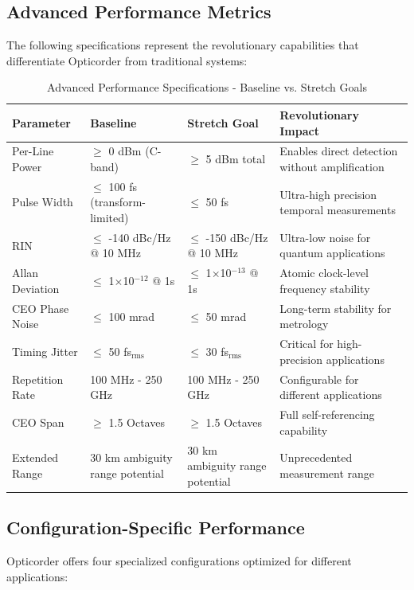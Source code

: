 \documentclass[11pt,a4paper]{article}
\begin{document}
\subsection{Advanced Performance Metrics}
The following specifications represent the revolutionary capabilities that differentiate Opticorder from traditional systems:

\begin{table}[ht]
\centering
\caption{Advanced Performance Specifications - Baseline vs. Stretch Goals}
\begin{tabular}{@{}llll@{}}
\toprule
\textbf{Parameter} & \textbf{Baseline} & \textbf{Stretch Goal} & \textbf{Revolutionary Impact} \\
\midrule
Per-Line Power & $\geq$ 0 dBm (C-band) & $\geq$ 5 dBm total & Enables direct detection without amplification \\
Pulse Width & $\leq$ 100 fs (transform-limited) & $\leq$ 50 fs & Ultra-high precision temporal measurements \\
RIN & $\leq$ -140 dBc/Hz @ 10 MHz & $\leq$ -150 dBc/Hz @ 10 MHz & Ultra-low noise for quantum applications \\
Allan Deviation & $\leq$ 1$\times$10$^{-12}$ @ 1s & $\leq$ 1$\times$10$^{-13}$ @ 1s & Atomic clock-level frequency stability \\
CEO Phase Noise & $\leq$ 100 mrad & $\leq$ 50 mrad & Long-term stability for metrology \\
Timing Jitter & $\leq$ 50 fs$_{\text{rms}}$ & $\leq$ 30 fs$_{\text{rms}}$ & Critical for high-precision applications \\
Repetition Rate & 100 MHz - 250 GHz & 100 MHz - 250 GHz & Configurable for different applications \\
CEO Span & $\geq$ 1.5 Octaves & $\geq$ 1.5 Octaves & Full self-referencing capability \\
Extended Range & 30 km ambiguity range potential & 30 km ambiguity range potential & Unprecedented measurement range \\
\bottomrule
\end{tabular}
\end{table}

\subsection{Configuration-Specific Performance}
Opticorder offers four specialized configurations optimized for different applications:
\end{document}
